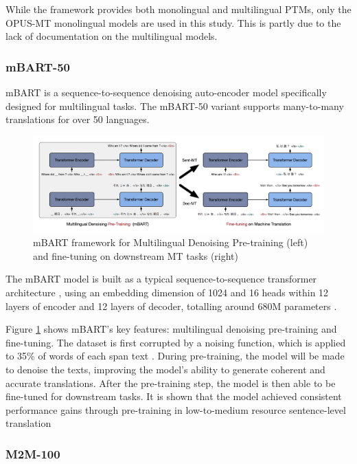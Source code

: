 \documentclass[a4paper, 11pt]{article}
\begin{document}
While the framework provides both monolingual and multilingual PTMs, only the OPUS-MT monolingual models are used in this study. This is partly due to the lack of documentation on the multilingual models.

\subsubsection{mBART-50}

mBART \cite{liu-2020-mbart} is a sequence-to-sequence denoising auto-encoder model specifically designed for multilingual tasks. The mBART-50 variant supports many-to-many translations for over 50 languages.

\begin{figure}[htbp]
    \centering
    \includegraphics[width=0.9\linewidth]{images/mbart.png}
    \caption{mBART framework for Multilingual Denoising Pre-training (left) and fine-tuning on downstream MT tasks
        (right) \cite{liu-2020-mbart}}
    \label{fig:mbart}
\end{figure}

The mBART model is built as a typical sequence-to-sequence transformer architecture \cite{vaswani-2017-attention}, using an embedding dimension of 1024 and 16 heads within 12 layers of encoder and 12 layers of decoder, totalling around 680M parameters \cite{liu-2020-mbart}.

Figure \ref{fig:mbart} shows mBART's key features: multilingual denoising pre-training and fine-tuning. The dataset is first corrupted by a noising function, which is applied to 35\% of words of each span text \cite{liu-2020-mbart}. During pre-training, the model will be made to denoise the texts, improving the model's ability to generate coherent and accurate translations. After the pre-training step, the model is then able to be fine-tuned for downstream tasks. It is shown that the model achieved consistent performance gains through pre-training in low-to-medium resource sentence-level translation \cite{liu-2020-mbart}

\subsubsection{M2M-100}
\end{document}
